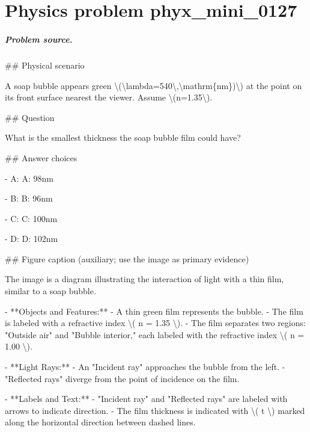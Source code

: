 
\chapter{Physics problem phyx\_mini\_0127}
\label{ch:PhyXMiniProblems_problem_phyx_mini_0127}

\paragraph{Problem source.}
\#\# Physical scenario

A soap bubble appears green \textbackslash{}(\textbackslash{}lambda=540\textbackslash{},\textbackslash{}mathrm\{nm\})\textbackslash{}) at the point on its front surface nearest the viewer. Assume \textbackslash{}(n=1.35\textbackslash{}).

\#\# Question

What is the smallest thickness the soap bubble film could have?

\#\# Answer choices

- A: A: 98nm

- B: B: 96nm

- C: C: 100nm

- D: D: 102nm

\#\# Figure caption (auxiliary; use the image as primary evidence)

The image is a diagram illustrating the interaction of light with a thin film, similar to a soap bubble. 

- **Objects and Features:**
  - A thin green film represents the bubble.
  - The film is labeled with a refractive index \textbackslash{}( n = 1.35 \textbackslash{}).
  - The film separates two regions: "Outside air" and "Bubble interior," each labeled with the refractive index \textbackslash{}( n = 1.00 \textbackslash{}).

- **Light Rays:**
  - An "Incident ray" approaches the bubble from the left.
  - "Reflected rays" diverge from the point of incidence on the film.

- **Labels and Text:**
  - "Incident ray" and "Reflected rays" are labeled with arrows to indicate direction.
  - The film thickness is indicated with \textbackslash{}( t \textbackslash{}) marked along the horizontal direction between dashed lines.

